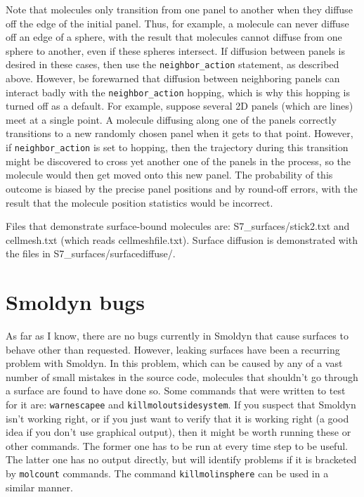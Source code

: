 \documentclass {scrbook}
\newcommand {\ttt} {\texttt}
\begin{document}
Note that molecules only transition from one panel to another when they diffuse off the edge of the initial panel. Thus, for example, a molecule can never diffuse off an edge of a sphere, with the result that molecules cannot diffuse from one sphere to another, even if these spheres intersect. If diffusion between panels is desired in these cases, then use the \ttt{neighbor\_action} statement, as described above. However, be forewarned that diffusion between neighboring panels can interact badly with the \ttt{neighbor\_action} hopping, which is why this hopping is turned off as a default. For example, suppose several 2D panels (which are lines) meet at a single point. A molecule diffusing along one of the panels correctly transitions to a new randomly chosen panel when it gets to that point. However, if \ttt{neighbor\_action} is set to hopping, then the trajectory during this transition might be discovered to cross yet another one of the panels in the process, so the molecule would then get moved onto this new panel. The probability of this outcome is biased by the precise panel positions and by round-off errors, with the result that the molecule position statistics would be incorrect.

Files that demonstrate surface-bound molecules are: S7\_surfaces/stick2.txt and cellmesh.txt (which reads cellmeshfile.txt). Surface diffusion is demonstrated with the files in S7\_surfaces/surfacediffuse/.

\section{Smoldyn bugs}

As far as I know, there are no bugs currently in Smoldyn that cause surfaces to behave other than requested. However, leaking surfaces have been a recurring problem with Smoldyn. In this problem, which can be caused by any of a vast number of small mistakes in the source code, molecules that shouldn't go through a surface are found to have done so. Some commands that were written to test for it are: \ttt{warnescapee} and \ttt{killmoloutsidesystem}. If you suspect that Smoldyn isn't working right, or if you just want to verify that it is working right (a good idea if you don't use graphical output), then it might be worth running these or other commands. The former one has to be run at every time step to be useful. The latter one has no output directly, but will identify problems if it is bracketed by \ttt{molcount} commands. The command \ttt{killmolinsphere} can be used in a similar manner.
\end{document}
